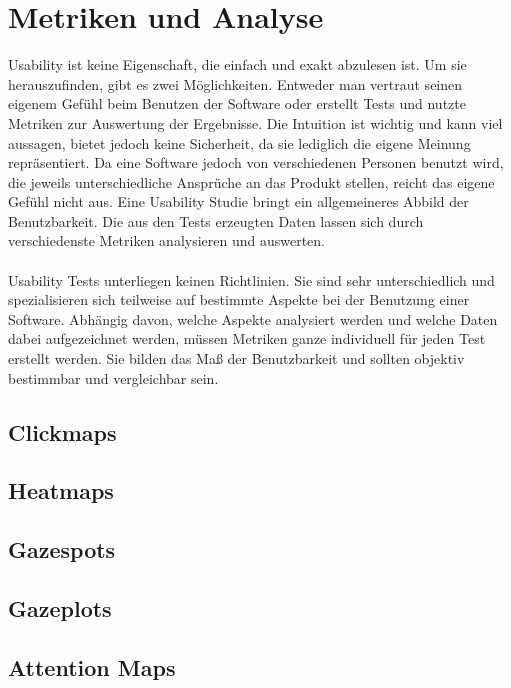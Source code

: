 %
%
%
%

\section{Metriken und Analyse}

Usability ist keine Eigenschaft, die einfach und exakt abzulesen ist. Um sie herauszufinden, gibt es zwei Möglichkeiten. Entweder man vertraut seinen eigenem Gefühl beim Benutzen der Software oder erstellt Tests und nutzte Metriken zur Auswertung der Ergebnisse. Die Intuition ist wichtig und kann viel aussagen, bietet jedoch keine Sicherheit, da sie lediglich die eigene Meinung repräsentiert. Da eine Software jedoch von verschiedenen Personen benutzt wird, die jeweils unterschiedliche Ansprüche an das Produkt stellen, reicht das eigene Gefühl nicht aus. Eine Usability Studie bringt ein allgemeineres Abbild der Benutzbarkeit. Die aus den Tests erzeugten Daten lassen sich durch verschiedenste Metriken analysieren und auswerten.\\
\\
Usability Tests unterliegen keinen Richtlinien. Sie sind sehr unterschiedlich und spezialisieren sich teilweise auf bestimmte Aspekte bei der Benutzung einer Software. Abhängig davon, welche Aspekte analysiert werden und welche Daten dabei aufgezeichnet werden, müssen Metriken ganze individuell für jeden Test erstellt werden. Sie bilden das Maß der Benutzbarkeit und sollten objektiv bestimmbar und vergleichbar sein.

\subsection{Clickmaps}
\subsection{Heatmaps}
\subsection{Gazespots}
\subsection{Gazeplots}
\subsection{Attention Maps}